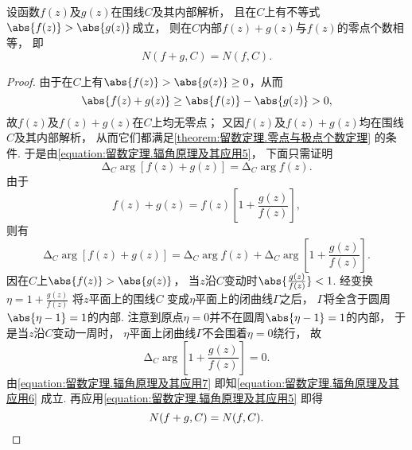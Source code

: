 \begin{theorem}[儒歇定理]
设函数\(f(z)\)及\(g(z)\)在围线\(C\)及其内部解析，
且在\(C\)上有不等式\(\abs{f(z)}>\abs{g(z)}\)成立，
则在\(C\)内部\(f(z)+g(z)\)与\(f(z)\)的零点个数相等，
即\begin{equation*}
	N(f+g,C) = N(f,C).
\end{equation*}
\begin{proof}
由于在\(C\)上有\(\abs{f(z)}>\abs{g(z)}\geq0\)，从而\begin{equation*}
\abs{f(z)+g(z)}\geq\abs{f(z)}-\abs{g(z)}>0,
\end{equation*}故\(f(z)\)及\(f(z)+g(z)\)在\(C\)上均无零点；
又因\(f(z)\)及\(f(z)+g(z)\)均在围线\(C\)及其内部解析，
从而它们都满足\cref{theorem:留数定理.零点与极点个数定理} 的条件.
于是由\cref{equation:留数定理.辐角原理及其应用5}，
下面只需证明\begin{equation}\label{equation:留数定理.辐角原理及其应用6}
	\increment_C \arg[f(z)+g(z)] = \increment_C \arg f(z).
\end{equation}
由于\begin{equation*}
	f(z)+g(z) = f(z) \left[1+\frac{g(z)}{f(z)}\right],
\end{equation*}
则有\begin{equation}\label{equation:留数定理.辐角原理及其应用7}
	\increment_C \arg[f(z)+g(z)]
	= \increment_C \arg f(z)
	+ \increment_C \arg\left[1+\frac{g(z)}{f(z)}\right].
\end{equation}
因在\(C\)上\(\abs{f(z)}>\abs{g(z)}\)，
当\(z\)沿\(C\)变动时\(\abs{\frac{g(z)}{f(z)}}<1\).
经变换\(\eta=1+\frac{g(z)}{f(z)}\)
将\(z\)平面上的围线\(C\)
变成\(\eta\)平面上的闭曲线\(\Gamma\)之后，
\(\Gamma\)将全含于圆周\(\abs{\eta-1}=1\)的内部.
注意到原点\(\eta=0\)并不在圆周\(\abs{\eta-1}=1\)的内部，
于是当\(z\)沿\(C\)变动一周时，
\(\eta\)平面上闭曲线\(\Gamma\)不会围着\(\eta=0\)绕行，
故\begin{equation*}
	\increment_C \arg\left[1+\frac{g(z)}{f(z)}\right] = 0.
\end{equation*}
由\cref{equation:留数定理.辐角原理及其应用7}
即知\cref{equation:留数定理.辐角原理及其应用6} 成立.
再应用\cref{equation:留数定理.辐角原理及其应用5}
即得\begin{equation*}
	N(f+g,C) = N(f,C).
	\qedhere
\end{equation*}
\end{proof}
\end{theorem}

